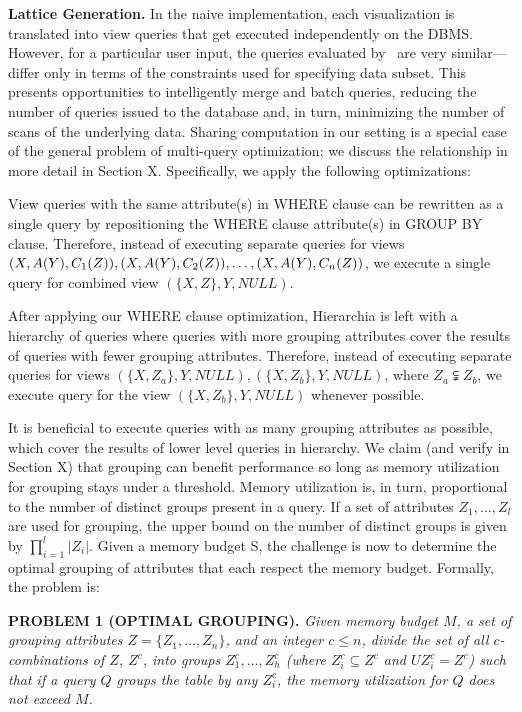 \textbf{Lattice Generation.} In the naive implementation, each visualization is translated into view queries that get executed independently on the DBMS. However, for a particular user input, the queries evaluated by \system\ are very similar--- differ only in terms of the constraints used for specifying data subset. This presents opportunities to intelligently merge and batch queries, reducing the number of queries issued to the database and, in turn, minimizing the number of scans of the underlying data. Sharing computation in our setting is a special case of the general problem of multi-query optimization; we discuss the relationship in more detail in Section X. Specifically, we apply the following optimizations:

View queries with the same attribute(s) in WHERE clause can be rewritten as a single query by repositioning the WHERE clause attribute(s) in GROUP BY clause. Therefore, instead of executing separate queries for views $(X, A(Y), C_1(Z)), (X, A(Y), C_2(Z)), \ldots, \\(X, A(Y), C_n(Z))$, we execute a single query for combined view $(\{X, Z\}, Y, NULL)$. 

After applying our WHERE clause optimization, Hierarchia is left with a hierarchy of queries where queries with more grouping attributes cover the results of queries with fewer grouping attributes. Therefore, instead of executing separate queries for views $(\{X, Z_a\}, Y, NULL), (\{X, Z_b\}, Y, NULL)$, where $Z_a \subsetneqq Z_b$, we execute query for the view $(\{X, Z_b\}, Y, NULL)$ whenever possible. 

It is beneficial to execute queries with as many grouping attributes as possible, which cover the results of lower level queries in hierarchy. We claim (and verify in Section X) that grouping can benefit performance so long as memory utilization for grouping stays under a threshold. Memory utilization is, in turn, proportional to the number of distinct groups present in a query. If a set of attributes $Z_1, \ldots, Z_l$ are used for grouping, the upper bound on the number of distinct groups is given by $\prod_{i=1}^{l}\lvert Z_i\rvert$. Given a memory budget S, the challenge is now to determine the optimal grouping of attributes that each respect the memory budget. Formally, the problem is:



\textbf{PROBLEM 1 (OPTIMAL GROUPING).} \emph{Given memory budget $M$, a set of grouping attributes $Z = \{Z_1, \ldots, Z_n\}$, and an integer $c \le n$, divide the set of all $c$-combinations of $Z$, $Z^c$, into groups $Z^c_1, \ldots, Z^c_h$ (where $Z^c_i \subseteq Z^c$ and $U Z^c_i = Z^c$) such that if a query $Q$ groups the table by any $Z^c_i$, the memory utilization for $Q$ does not exceed $M$.}

